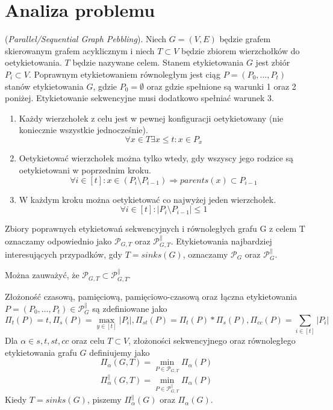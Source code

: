 \chapter{Analiza problemu}
\thispagestyle{chapterBeginStyle}
\label{rozdzial1}

\begin{definition}
	(\textit{Parallel/Sequential Graph Pebbling}). Niech $G = (V, E)$ będzie grafem skierowanym grafem acyklicznym i niech $T \subset V$ będzie zbiorem wierzchołków do oetykietowania. $T$ będzie nazywane celem.
	Stanem etykietowania $G$ jest zbiór $P_{i} \subset V$.
	Poprawnym etykietowaniem równoległym jest ciąg $P = (P_{0}, \dots , P_{t})$ stanów etykietowania $G$,
	gdzie $P_{0} = \emptyset $ oraz gdzie spełnione są warunki 1 oraz 2 poniżej.
	Etykietowanie sekwencyjne musi dodatkowo spełniać warunek 3.
	\begin{enumerate}
		\item Każdy wierzchołek z celu jest w pewnej konfiguracji oetykietowany (nie koniecznie wszystkie jednocześnie).
		$$ \forall x \in T \exists x \leq t : x \in P_{x} $$
		
		\item Oetykietować wierzchołek można tylko wtedy, gdy wszyscy jego rodzice
		są oetykietowani w poprzednim kroku.
		$$ \forall i \in [t] : x \in (P_{i} \setminus P_{i-1}) \Rightarrow parents(x) \subset P_{i-1} $$
		
		\item W każdym kroku można oetykietować co najwyżej jeden wierzchołek.
		$$ \forall i \in [t]: | P_{i} \setminus P_{i-1} | \leq 1 $$
	\end{enumerate}
	Zbiory poprawnych etykietowań sekwencyjnych i równoległych grafu G z celem T oznaczamy odpowiednio jako 
	$ \mathcal{P}_{G,T} $ oraz $ \mathcal{P}_{G,T}^{ \parallel } $.
	Etykietowania najbardziej interesujących przypadków, gdy $T = sinks(G)$, oznaczamy $ \mathcal{P}_{G} $ oraz $ \mathcal{P}_{G}^{ \parallel } $.
\end{definition}


 Można zauważyć, że $ \mathcal{P}_{G,T} \subset  \mathcal{P}_{G,T}^{ \parallel } $.



\begin{definition}
	Złożoność czasową, pamięciową, pamięciowo-czasową oraz łączna etykietowania $ P = (P_{0}, \dots , P_{t} ) \in \mathcal{P}_{G}^{ \parallel } $ są zdefiniowane jako
	$$ \Pi_{t}(P) = t, \Pi_{s}(P) = \max_{y \in [t]} | P_{i} |, \Pi_{st}(P) = \Pi_{t}(P) * \Pi_{s}(P), \Pi_{cc}(P) = \sum_{i \in [t]}| P_{i}|$$
	Dla $ \alpha \in {s, t, st, cc}$ oraz celu $T \subset V $, złożoności sekwencyjnego oraz równoległego
	etykietowania grafu $G$ definiujemy jako
	$$ \Pi_{ \alpha }(G, T) = \min_{P \in \mathcal{P}_{G,T}} \Pi_{ \alpha } (P) $$
	$$ \Pi_{ \alpha }^{ \parallel }(G, T) = \min_{P \in \mathcal{P}_{G,T}^{ \parallel }} \Pi_{ \alpha } (P) $$
	Kiedy $T = sinks(G)$, piszemy $ \Pi_{ \alpha }^{ \parallel }(G) $ oraz $ \Pi_{ \alpha }(G) $.
	
\end{definition}


